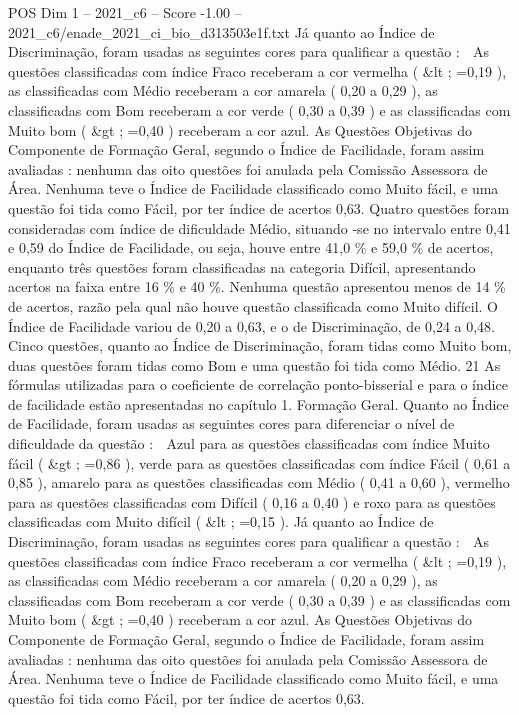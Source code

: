 \begin{textsample}{POS Dim 1 – 2021\_c6 – Score -1.00 – 2021\_c6/enade\_2021\_ci\_bio\_d313503e1f.txt}
Já quanto ao Índice de Discriminação, foram usadas as seguintes cores para qualificar a questão :  As questões classificadas com índice Fraco receberam a cor vermelha ( \&lt ; =0,19 ), as classificadas com Médio receberam a cor amarela ( 0,20 a 0,29 ), as classificadas com Bom receberam a cor verde ( 0,30 a 0,39 ) e as classificadas com Muito bom ( \&gt ; =0,40 ) receberam a cor azul.
As Questões Objetivas do Componente de Formação Geral, segundo o Índice de Facilidade, foram assim avaliadas : nenhuma das oito questões foi anulada pela Comissão Assessora de Área.
Nenhuma teve o Índice de Facilidade classificado como Muito fácil, e uma questão foi tida como Fácil, por ter índice de acertos 0,63.
Quatro questões foram consideradas com índice de dificuldade Médio, situando -se no intervalo entre 0,41 e 0,59 do Índice de Facilidade, ou seja, houve entre 41,0 \% e 59,0 \% de acertos, enquanto três questões foram classificadas na categoria Difícil, apresentando acertos na faixa entre 16 \% e 40 \%.
Nenhuma questão apresentou menos de 14 \% de acertos, razão pela qual não houve questão classificada como Muito difícil.
O Índice de Facilidade variou de 0,20 a 0,63, e o de Discriminação, de 0,24 a 0,48.
Cinco questões, quanto ao Índice de Discriminação, foram tidas como Muito bom, duas questões foram tidas como Bom e uma questão foi tida como Médio. 21 As fórmulas utilizadas para o coeficiente de correlação ponto-bisserial e para o índice de facilidade estão apresentadas no capítulo 1.
Formação Geral.
Quanto ao Índice de Facilidade, foram usadas as seguintes cores para diferenciar o nível de dificuldade da questão :  Azul para as questões classificadas com índice Muito fácil ( \&gt ; =0,86 ), verde para as questões classificadas com índice Fácil ( 0,61 a 0,85 ), amarelo para as questões classificadas com Médio ( 0,41 a 0,60 ), vermelho para as questões classificadas com Difícil ( 0,16 a 0,40 ) e roxo para as questões classificadas com Muito difícil ( \&lt ; =0,15 ).
Já quanto ao Índice de Discriminação, foram usadas as seguintes cores para qualificar a questão :  As questões classificadas com índice Fraco receberam a cor vermelha ( \&lt ; =0,19 ), as classificadas com Médio receberam a cor amarela ( 0,20 a 0,29 ), as classificadas com Bom receberam a cor verde ( 0,30 a 0,39 ) e as classificadas com Muito bom ( \&gt ; =0,40 ) receberam a cor azul.
As Questões Objetivas do Componente de Formação Geral, segundo o Índice de Facilidade, foram assim avaliadas : nenhuma das oito questões foi anulada pela Comissão Assessora de Área.
Nenhuma teve o Índice de Facilidade classificado como Muito fácil, e uma questão foi tida como Fácil, por ter índice de acertos 0,63.

\end{textsample}
